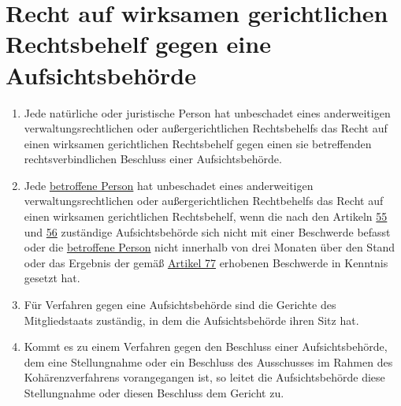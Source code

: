 \chapter{Recht auf wirksamen gerichtlichen Rechtsbehelf gegen eine Aufsichtsbehörde}
\label{ch:78}


\begin{enumerate}

  \item Jede natürliche oder juristische Person hat unbeschadet eines anderweitigen verwaltungsrechtlichen oder
   außergerichtlichen Rechtsbehelfs das Recht auf einen wirksamen gerichtlichen Rechtsbehelf gegen einen sie
   betreffenden rechtsverbindlichen Beschluss einer Aufsichtsbehörde.
  \label{itm:78-1}

  \item Jede \hyperref[itm:04-1]{betroffene Person} hat unbeschadet eines anderweitigen verwaltungsrechtlichen oder außergerichtlichen
   Rechtbehelfs das Recht auf einen wirksamen gerichtlichen Rechtsbehelf, wenn die nach den Artikeln \hyperref[ch:55]
   {55} und \hyperref[ch:56]{56} zuständige Aufsichtsbehörde sich nicht mit einer Beschwerde befasst oder die
   \hyperref[itm:04-1]{betroffene Person} nicht innerhalb von drei Monaten über den Stand oder das Ergebnis der gemäß \hyperref[ch:77]
   {Artikel 77} erhobenen Beschwerde in Kenntnis gesetzt hat.
  \label{itm:78-2}

  \item Für Verfahren gegen eine Aufsichtsbehörde sind die Gerichte des Mitgliedstaats zuständig, in dem die
   Aufsichtsbehörde ihren Sitz hat.
  \label{itm:78-3}

  \item Kommt es zu einem Verfahren gegen den Beschluss einer Aufsichtsbehörde, dem eine Stellungnahme oder ein
   Beschluss des Ausschusses im Rahmen des Kohärenzverfahrens vorangegangen ist, so leitet die Aufsichtsbehörde diese
   Stellungnahme oder diesen Beschluss dem Gericht zu.
  \label{itm:78-4}

\end{enumerate}


